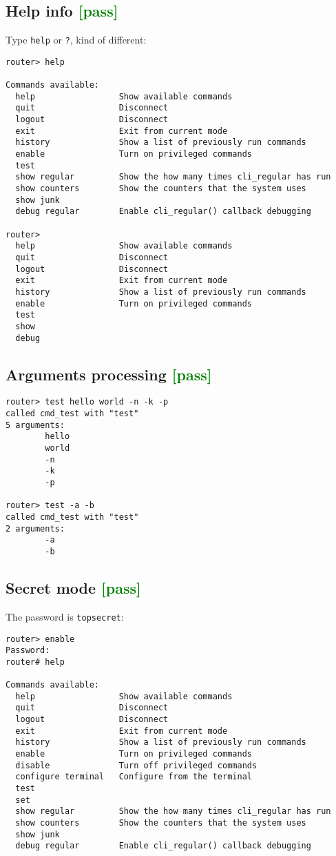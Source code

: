 \documentclass[a4paper]{report}
\begin{document}
\subsection{Help info \textcolor{green}{[pass]}}
Type {\tt help} or {\tt ?}, kind of different:
\begin{lstlisting}
router> help

Commands available:
  help                 Show available commands
  quit                 Disconnect
  logout               Disconnect
  exit                 Exit from current mode
  history              Show a list of previously run commands
  enable               Turn on privileged commands
  test                 
  show regular         Show the how many times cli_regular has run
  show counters        Show the counters that the system uses
  show junk            
  debug regular        Enable cli_regular() callback debugging

router> 
  help                 Show available commands
  quit                 Disconnect
  logout               Disconnect
  exit                 Exit from current mode
  history              Show a list of previously run commands
  enable               Turn on privileged commands
  test                 
  show                 
  debug                

\end{lstlisting}
\subsection{Arguments processing \textcolor{green}{[pass]}}
\begin{lstlisting}
router> test hello world -n -k -p
called cmd_test with "test"
5 arguments:
        hello
        world
        -n
        -k
        -p

router> test -a -b
called cmd_test with "test"
2 arguments:
        -a
        -b

\end{lstlisting}
\subsection{Secret mode \textcolor{green}{[pass]}}
The password is {\tt topsecret}:
\begin{lstlisting}
router> enable
Password: 
router# help

Commands available:
  help                 Show available commands
  quit                 Disconnect
  logout               Disconnect
  exit                 Exit from current mode
  history              Show a list of previously run commands
  enable               Turn on privileged commands
  disable              Turn off privileged commands
  configure terminal   Configure from the terminal
  test                 
  set                  
  show regular         Show the how many times cli_regular has run
  show counters        Show the counters that the system uses
  show junk            
  debug regular        Enable cli_regular() callback debugging

\end{lstlisting}
\end{document}
